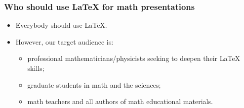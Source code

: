 \begin{frame}
\frametitle{Who should use \LaTeX{} for math presentations}

\begin{itemize}
\item Everybody should use \LaTeX{}.
\item However, our target audience is:

\begin{itemize}
\item professional mathematicians/physicists seeking to deepen their \LaTeX{} skills;
\item graduate students in math and the sciences;
\item math teachers and all authors of math educational materials.
\end{itemize}
\end{itemize}
\end{frame}